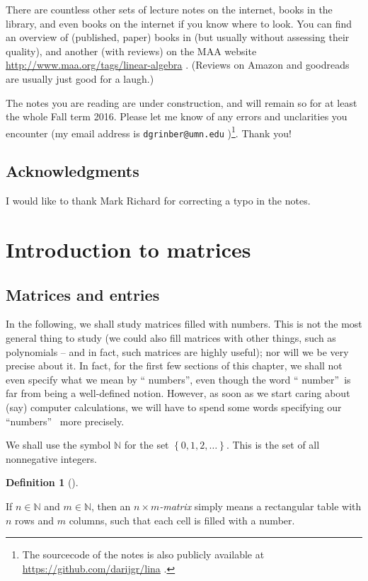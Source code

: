 \documentclass[numbers=enddot,12pt,final,onecolumn,notitlepage]{scrartcl}%
\theoremstyle{definition}
\newtheorem{defi}[theo]{Definition}
\newenvironment{definition}[1][]
{\begin{defi}[#1]\begin{leftbar}}
{\end{leftbar}\end{defi}}
\begin{document}
There are countless other sets of lecture notes on the internet, books in the
library, and even books on the internet if you know where to look. You can
find an overview of (published, paper) books in \cite{Drucker12} (but usually
without assessing their quality), and another (with reviews) on the MAA
website \url{http://www.maa.org/tags/linear-algebra} . (Reviews on Amazon and
goodreads are usually just good for a laugh.)

The notes you are reading are under construction, and will remain so for at
least the whole Fall term 2016. Please let me know of any errors and
unclarities you encounter (my email address is \texttt{dgrinber@umn.edu}%
)\footnote{The sourcecode of the notes is also publicly available at
\url{https://github.com/darijgr/lina} .}. Thank you!

\subsection{Acknowledgments}

I would like to thank Mark Richard for correcting a typo in the notes.

\section{\label{chp.intro}Introduction to matrices}

\subsection{Matrices and entries}

In the following, we shall study matrices filled with numbers. This is not the
most general thing to study (we could also fill matrices with other things,
such as polynomials -- and in fact, such matrices are highly useful); nor will
we be very precise about it. In fact, for the first few sections of this
chapter, we shall not even specify what we mean by \textquotedblleft
numbers\textquotedblright, even though the word \textquotedblleft
number\textquotedblright\ is far from being a well-defined notion. However, as
soon as we start caring about (say) computer calculations, we will have to
spend some words specifying our \textquotedblleft numbers\textquotedblright%
\ more precisely.

We shall use the symbol $\mathbb{N}$ for the set $\left\{  0,1,2,\ldots
\right\}  $. This is the set of all nonnegative integers.

\begin{definition}
If $n\in\mathbb{N}$ and $m\in\mathbb{N}$, then an $n\times m$\textit{-matrix}
simply means a rectangular table with $n$ rows and $m$ columns, such that each
cell is filled with a number.
\end{definition}
\end{document}
